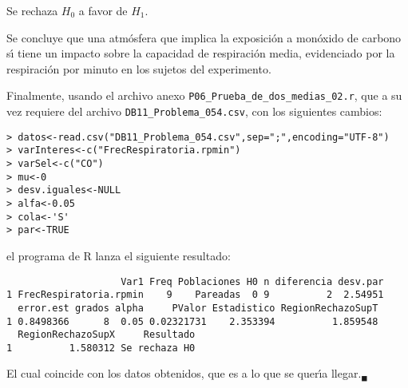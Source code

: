 \begin{solucion}
 \begin{decision}
  Se rechaza $H_0$ a favor de $H_1$.
 \end{decision}

 \begin{conclusion}
  Se concluye que una atm\'osfera que implica la exposici\'on a mon\'oxido de carbono
  s\'{\i} tiene un impacto sobre la capacidad de respiraci\'on media,
  evidenciado por la respiraci\'on por minuto en los sujetos del experimento.  
 \end{conclusion}
 Finalmente, usando el archivo anexo \texttt{P06\_Prueba\_de\_dos\_medias\_02.r},
 que a su vez requiere del archivo \texttt{DB11\_Problema\_054.csv},
 con los siguientes cambios:
 \begin{verbatim}
> datos<-read.csv("DB11_Problema_054.csv",sep=";",encoding="UTF-8")
> varInteres<-c("FrecRespiratoria.rpmin")
> varSel<-c("CO")
> mu<-0
> desv.iguales<-NULL
> alfa<-0.05
> cola<-'S'
> par<-TRUE
 \end{verbatim}
 \vspace{-0.5cm}
 el programa de R lanza el siguiente resultado:
 \begin{verbatim}
                    Var1 Freq Poblaciones H0 n diferencia desv.par
1 FrecRespiratoria.rpmin    9    Pareadas  0 9          2  2.54951
  error.est grados alpha     PValor Estadistico RegionRechazoSupT
1 0.8498366      8  0.05 0.02321731    2.353394          1.859548
  RegionRechazoSupX     Resultado
1          1.580312 Se rechaza H0
 \end{verbatim}
 El cual coincide con los datos obtenidos,
 que es a lo que se quer\'{\i}a llegar.${}_{\blacksquare}$
\end{solucion}
